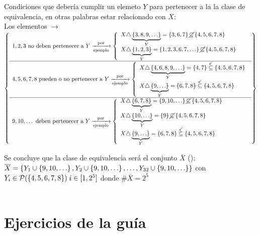 Condiciones que debería cumplir un elemeto $Y$ para pertenecer a la la clase de equivalencia, en otras palabras estar relacionado con $X$:\\
Los elementos $\to$\\
$\llaves{l}{
		1, 2, 3 \text{ no deben pertenecer a } Y \flecha{por}[ejemplo]
		\llave{l}{
			X \triangle \underbrace{\set{3,8,9,\dots}}_Y = \set{3,6,7} \cancel{\subseteq} \set{4,5,6,7,8}\\
			X \triangle \underbrace{\set{1,2,3}}_Y = \set{1,2,3,6,7,\dots} \cancel{\subseteq} \set{4,5,6,7,8}\\
		}\\ \hline

		4,5,6,7,8 \text{ pueden o no pertenecer a } Y \flecha{por}[ejemplo]
		\llave{l}{
			X \triangle \underbrace{\set{4,6,8,9,\dots}}_Y = \set{4,7} \stackrel{\checkmark}\subseteq \set{4,5,6,7,8}\\
			X \triangle \underbrace{\set{9,\dots}}_Y = \set{6,7,8} \stackrel{\checkmark}\subseteq \set{4,5,6,7,8}
		}\\ \hline

		9,10, \dots \text{ deben pertenecer a } Y \flecha{por}[ejemplo]
		\llave{l}{
			X \triangle \underbrace{\set{6,7,8}}_Y = \set{9,10,\dots} \cancel\subseteq \set{4,5,6,7,8}\\
			X \triangle \underbrace{\set{10,\dots}}_Y = \set{9} \cancel\subseteq \set{4,5,6,7,8}\\
			X \triangle \underbrace{\set{9,\dots}}_Y = \set{6,7,8} \stackrel{\checkmark}\subseteq \set{4,5,6,7,8}
		}
	}$

Se concluye que la clase de equivalencia será el conjunto $\overline{X}$ ():\\
$\overline{X} = \set{ Y_1  \union \set{9,10,\dots}, Y_2  \union \set{9,10,\dots}, \dots, Y_{32}  \union \set{9,10,\dots}}$
con
$Y_i \in \mathcal P(\left\{ 4,5,6,7,8 \right\})\; i \in [1,2^5] $ donde $\#\overline{X} = 2^5$\\

\noindent{}\\


\section*{Ejercicios de la guía}

\ejercicio

\ejercicio
\ejercicio
\ejercicio
\ejercicio
\ejercicio
\ejercicio
\ejercicio


